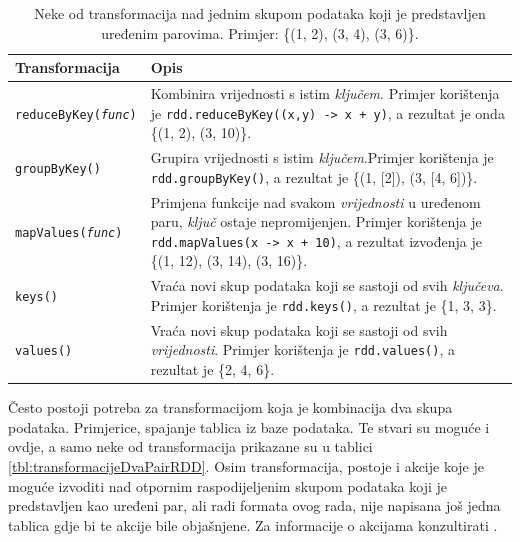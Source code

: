 \documentclass[times, utf8, zavrsni, numeric]{fer}
\begin{document}
\begin{table}[htb]
\caption{Neke od transformacija nad jednim skupom podataka koji je predstavljen uređenim parovima. Primjer: \{(1, 2), (3, 4), (3, 6)\}.}
\label{tbl:transformacijeJedanPairRDD}
\centering
\begin{tabular}{lp{10cm}} 
\hline
Transformacija & Opis\\
\hline

\texttt{reduceByKey(\emph{func})} & Kombinira vrijednosti s istim \emph{ključem}. Primjer korištenja je  \texttt{rdd.reduceByKey((x,y) -> x + y)}, a rezultat je onda \{(1, 2), (3, 10)\}.\\

\texttt{groupByKey()} & Grupira vrijednosti s istim \emph{ključem}.\newline Primjer korištenja je \texttt{rdd.groupByKey()}, a rezultat je  \{(1, [2]), (3, [4, 6])\}.\\

\texttt{mapValues(\emph{func})} & Primjena funkcije nad svakom \emph{vrijednosti} u uređenom paru, \emph{ključ} ostaje nepromijenjen. Primjer korištenja je \texttt{rdd.mapValues(x -> x + 10)}, a rezultat izvođenja je \{(1, 12), (3, 14), (3, 16)\}.\\

\texttt{keys()} & Vraća novi skup podataka koji se sastoji od svih \emph{ključeva}. Primjer korištenja je \texttt{rdd.keys()}, a rezultat je \{1, 3, 3\}.\\

\texttt{values()} & Vraća novi skup podataka koji se sastoji od svih \emph{vrijednosti}. Primjer korištenja je \texttt{rdd.values()}, a rezultat je \{2, 4, 6\}.\\
\hline
\end{tabular}
\end{table}

Često postoji potreba za transformacijom koja je kombinacija dva skupa podataka. Primjerice, spajanje tablica iz baze podataka. Te stvari su moguće i ovdje, a samo neke od transformacija prikazane su u tablici \ref{tbl:transformacijeDvaPairRDD}. Osim transformacija, postoje i akcije koje je moguće izvoditi nad otpornim raspodijeljenim skupom podataka koji je predstavljen kao uređeni par, ali radi formata ovog rada, nije napisana još jedna tablica gdje bi te akcije bile objašnjene. Za informacije o akcijama konzultirati \cite{officialDocumentation}.
\end{document}
